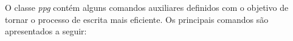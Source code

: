O classe \textit{ppg} contém alguns comandos auxiliares definidos com o objetivo de tornar o processo de escrita mais eficiente. Os principais comandos são apresentados a seguir:

\begin{description}
    
    \item[]
    \item[]
    \item[]
    \item[]
    \item[]
    \item[]
    \item[]
    \item[]
    \item[]
    \item[]
    
\end{description}